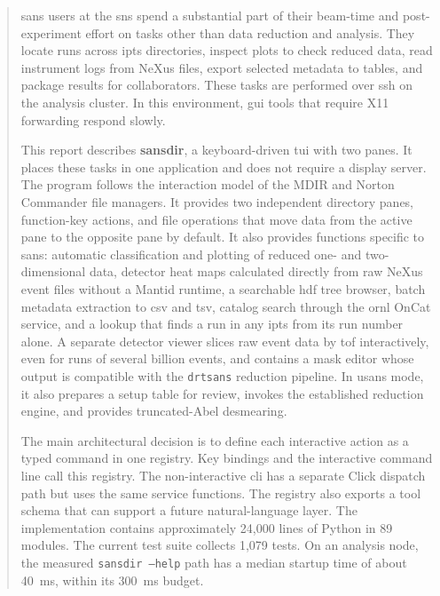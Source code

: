 \documentclass[tm]{ornltm}
\begin{document}
\mainmatter
\begin{abstract}

\Ac{sans} users at the \ac{sns} spend a substantial part of their beam-time and
post-experiment effort on tasks other than data reduction and analysis. They
locate runs across \ac{ipts} directories, inspect plots to check reduced data,
read instrument logs from NeXus files, export selected metadata to tables, and
package results for collaborators. These tasks are performed over \ac{ssh} on
the analysis cluster. In this environment, \ac{gui} tools that require X11
forwarding respond slowly.

This report describes \textbf{sansdir}, a keyboard-driven \ac{tui} with two
panes. It places these tasks in one application and does not require a display
server. The program follows the interaction model of the MDIR and Norton
Commander file managers. It provides two independent directory panes,
function-key actions, and file operations that move data from the active pane to
the opposite pane by default. It also provides functions specific to \ac{sans}:
automatic classification and plotting of reduced one- and two-dimensional data,
detector heat maps calculated directly from raw NeXus event files without a
Mantid runtime, a searchable \ac{hdf} tree browser, batch metadata extraction to
\ac{csv} and \ac{tsv}, catalog search through the \ac{ornl} OnCat service, and
a lookup that finds a run in any \ac{ipts} from its run number alone. A separate
detector viewer slices raw event data by \ac{tof} interactively, even for runs
of several billion events, and contains a mask editor whose output is
compatible with the \texttt{drtsans} reduction pipeline. In \ac{usans} mode, it also prepares a setup table for
review, invokes the established reduction engine, and provides truncated-Abel
desmearing.

The main architectural decision is to define each interactive action as a typed
command in one registry. Key bindings and the interactive command line call this
registry. The non-interactive \ac{cli} has a separate Click dispatch path but
uses the same service functions. The registry also exports a tool schema that
can support a future natural-language layer. The implementation contains
approximately 24,000 lines of Python in 89 modules. The current test suite
collects 1,079 tests. On an analysis node, the measured
\texttt{sansdir --help} path has a median startup time of about 40~ms, within
its 300~ms budget.

\end{abstract}
\end{document}
